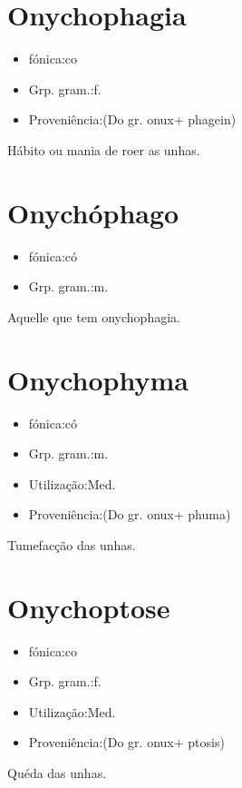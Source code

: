\section{Onychophagia}
\begin{itemize}
\item {fónica:co}
\end{itemize}
\begin{itemize}
\item {Grp. gram.:f.}
\end{itemize}
\begin{itemize}
\item {Proveniência:(Do gr. \textunderscore onux\textunderscore  + \textunderscore phagein\textunderscore )}
\end{itemize}
Hábito ou mania de roer as unhas.
\section{Onychóphago}
\begin{itemize}
\item {fónica:có}
\end{itemize}
\begin{itemize}
\item {Grp. gram.:m.}
\end{itemize}
Aquelle que tem onychophagia.
\section{Onychophyma}
\begin{itemize}
\item {fónica:có}
\end{itemize}
\begin{itemize}
\item {Grp. gram.:m.}
\end{itemize}
\begin{itemize}
\item {Utilização:Med.}
\end{itemize}
\begin{itemize}
\item {Proveniência:(Do gr. \textunderscore onux\textunderscore  + \textunderscore phuma\textunderscore )}
\end{itemize}
Tumefacção das unhas.
\section{Onychoptose}
\begin{itemize}
\item {fónica:co}
\end{itemize}
\begin{itemize}
\item {Grp. gram.:f.}
\end{itemize}
\begin{itemize}
\item {Utilização:Med.}
\end{itemize}
\begin{itemize}
\item {Proveniência:(Do gr. \textunderscore onux\textunderscore  + \textunderscore ptosis\textunderscore )}
\end{itemize}
Quéda das unhas.
